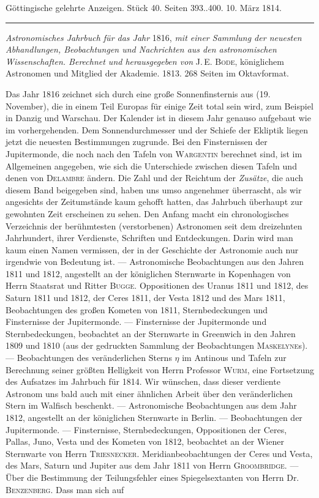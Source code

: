 \clearpage
{}
\hypertarget{native-568-lower}{}
\begin{center}\small Göttingische gelehrte Anzeigen. Stück 40. Seiten 393..400. 10. März 1814.\\[3pt]\rule{.72\linewidth}{.3pt}\end{center}

\emph{Astronomisches Jahrbuch für das Jahr} 1816, \emph{mit einer Sammlung der neuesten Abhandlungen, Beobachtungen und Nachrichten aus den astronomischen Wissenschaften. Berechnet und herausgegeben von} J.\,E. \textsc{Bode}, königlichem Astronomen und Mitglied der Akademie. 1813. 268 Seiten im Oktavformat.

Das Jahr 1816 zeichnet sich durch eine große Sonnenfinsternis aus (19. November), die in einem Teil Europas für einige Zeit total sein wird, zum Beispiel in Danzig und Warschau. Der Kalender ist in diesem Jahr genauso aufgebaut wie im vorhergehenden. Dem Sonnendurchmesser und der Schiefe der Ekliptik liegen jetzt die neuesten Bestimmungen zugrunde. Bei den Finsternissen der Jupitermonde, die noch nach den Tafeln von \textsc{Wargentin} berechnet sind, ist im Allgemeinen angegeben, wie sich die Unterschiede zwischen diesen Tafeln und denen von \textsc{Delambre} ändern. Die Zahl und der Reichtum der \emph{Zusätze}, die auch diesem Band beigegeben sind, haben uns umso angenehmer überrascht, als wir angesichts der Zeitumstände kaum gehofft hatten, das Jahrbuch überhaupt zur gewohnten Zeit erscheinen zu sehen. Den Anfang macht ein chronologisches Verzeichnis der berühmtesten (verstorbenen) Astronomen seit dem dreizehnten Jahrhundert, ihrer Verdienste, Schriften und Entdeckungen. Darin wird man kaum einen Namen vermissen, der in der Geschichte der Astronomie auch nur irgendwie von Bedeutung ist. — Astronomische Beobachtungen aus den Jahren 1811 und 1812, angestellt an der königlichen Sternwarte in Kopenhagen von Herrn Staatsrat und Ritter \textsc{Bugge}. Oppositionen des Uranus 1811 und 1812, des Saturn 1811 und 1812, der Ceres 1811, der Vesta 1812 und des Mars 1811, Beobachtungen des großen Kometen von 1811, Sternbedeckungen und Finsternisse der Jupitermonde. — Finsternisse der Jupitermonde und Sternbedeckungen, beobachtet an der Sternwarte in Greenwich in den Jahren 1809 und 1810 (aus der gedruckten Sammlung der Beobachtungen \textsc{Maskelyne}s). — Beobachtungen des veränderlichen Sterns $\eta$ im Antinous und Tafeln zur Berechnung seiner größten Helligkeit von Herrn Professor \textsc{Wurm}, eine Fortsetzung des Aufsatzes im Jahrbuch für 1814. Wir wünschen, dass dieser verdiente Astronom uns bald auch mit einer ähnlichen Arbeit über den veränderlichen Stern im Walfisch beschenkt. — Astronomische Beobachtungen aus dem Jahr 1812, angestellt an der königlichen Sternwarte in Berlin. — Beobachtungen der Jupitermonde. — Finsternisse, Sternbedeckungen, Oppositionen der Ceres, Pallas, Juno, Vesta und des Kometen von 1812, beobachtet an der Wiener Sternwarte von Herrn \textsc{Triesnecker}. Meridianbeobachtungen der Ceres und Vesta, des Mars, Saturn und Jupiter aus dem Jahr 1811 von Herrn \textsc{Groombridge}. — Über die Bestimmung der Teilungsfehler eines Spiegelsextanten von Herrn Dr. \textsc{Benzenberg}. Dass man sich auf 